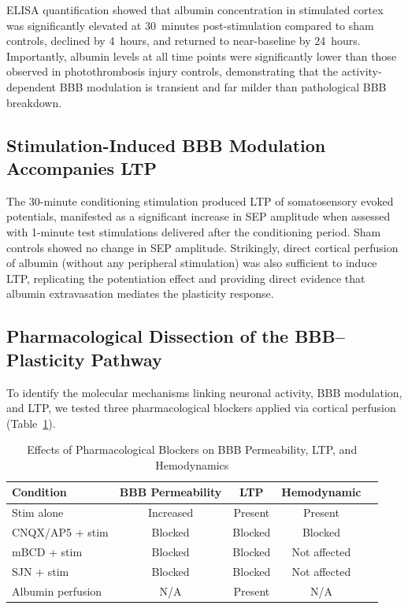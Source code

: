 \documentclass[11pt]{article}
\begin{document}
ELISA quantification showed that albumin concentration in stimulated cortex was significantly elevated at 30~minutes post-stimulation compared to sham controls, declined by 4~hours, and returned to near-baseline by 24~hours. Importantly, albumin levels at all time points were significantly lower than those observed in photothrombosis injury controls, demonstrating that the activity-dependent BBB modulation is transient and far milder than pathological BBB breakdown.

\subsection{Stimulation-Induced BBB Modulation Accompanies LTP}

The 30-minute conditioning stimulation produced LTP of somatosensory evoked potentials, manifested as a significant increase in SEP amplitude when assessed with 1-minute test stimulations delivered after the conditioning period. Sham controls showed no change in SEP amplitude. Strikingly, direct cortical perfusion of albumin (without any peripheral stimulation) was also sufficient to induce LTP, replicating the potentiation effect and providing direct evidence that albumin extravasation mediates the plasticity response.

\subsection{Pharmacological Dissection of the BBB--Plasticity Pathway}

To identify the molecular mechanisms linking neuronal activity, BBB modulation, and LTP, we tested three pharmacological blockers applied via cortical perfusion (Table~\ref{tab:blockers}).

\begin{table}[ht]
\centering
\caption{Effects of Pharmacological Blockers on BBB Permeability, LTP, and Hemodynamics}
\label{tab:blockers}
\begin{tabular}{lcccc}
\toprule
\textbf{Condition} & \textbf{BBB Permeability} & \textbf{LTP} & \textbf{Hemodynamic} \\
\midrule
Stim alone & Increased & Present & Present \\
CNQX/AP5 + stim & Blocked & Blocked & Blocked \\
mBCD + stim & Blocked & Blocked & Not affected \\
SJN + stim & Blocked & Blocked & Not affected \\
Albumin perfusion & N/A & Present & N/A \\
\bottomrule
\end{tabular}
\end{table}
\end{document}

